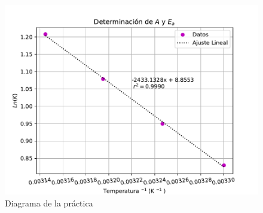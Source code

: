 \begin{enumerate}
    \begin{figure}[H]
        \centering
        \includegraphics[scale = 0.8]{Figuras/ln_k_t.pdf}
        \caption{Diagrama de la pr\'{a}ctica}
    \end{figure}


\end{enumerate}

